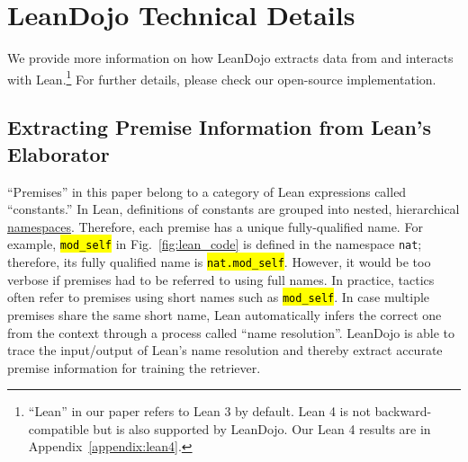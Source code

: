 \documentclass{article}
\DeclareRobustCommand{\hlorange}[1]{{\sethlcolor{myorange}\hl{#1}}}
\begin{document}
\setcounter{table}{0}
\renewcommand{\thetable}{\Alph{table}}
\setcounter{figure}{0}
\renewcommand{\thefigure}{\Alph{figure}}
\setcounter{section}{0}
\renewcommand{\thesection}{\Alph{section}}


\section{LeanDojo Technical Details}
\label{appendix:leandojo}

We provide more information on how LeanDojo extracts data from and interacts with Lean.\footnote{``Lean'' in our paper refers to Lean 3 by default. Lean 4 is not backward-compatible but is also supported by LeanDojo. Our Lean 4 results are in Appendix~\ref{appendix:lean4}.} For further details, please check our open-source implementation. 

\subsection{Extracting Premise Information from Lean's Elaborator}
\label{appendix:leandojo:premises}

``Premises'' in this paper belong to a category of Lean expressions called ``constants.'' In Lean, definitions of constants are grouped into nested, hierarchical \href{https://leanprover.github.io/theorem_proving_in_lean/dependent_type_theory.html#namespaces}{namespaces}. Therefore, each premise has a unique fully-qualified name. For example, \hlorange{\texttt{mod\_self}} in Fig.~\ref{fig:lean_code} is defined in the namespace \texttt{nat}; therefore, its fully qualified name is \texttt{\hlorange{nat.mod\_self}}. However, it would be too verbose if premises had to be referred to using full names. In practice, tactics often refer to premises using short names such as \hlorange{\texttt{mod\_self}}. In case multiple premises share the same short name, Lean automatically infers the correct one from the context through a process called ``name resolution''. LeanDojo is able to trace the input/output of Lean's name resolution and thereby extract accurate premise information for training the retriever.
\end{document}
